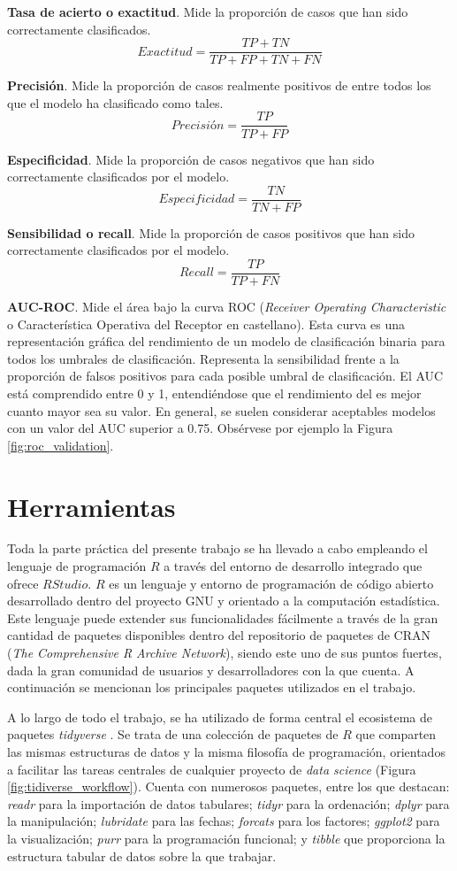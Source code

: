 \documentclass[12pt,a4paper,]{book}
\numberwithin{dummy}{section}
\theoremstyle{ocrenumbox}
\theoremstyle{blacknumex}
\theoremstyle{blacknumbox}
\theoremstyle{ocrenum}
\theoremstyle{ocrenum}
\begin{document}
\textbf{Tasa de acierto o exactitud}. Mide la proporción de casos que
han sido correctamente clasificados.
\[Exactitud = \frac{TP + TN}{TP + FP + TN + FN}\]

\textbf{Precisión}. Mide la proporción de casos realmente positivos de
entre todos los que el modelo ha clasificado como tales.
\[ Precisión = \frac{TP}{TP + FP}\]

\textbf{Especificidad}. Mide la proporción de casos negativos que han
sido correctamente clasificados por el modelo.
\[ Especificidad = \frac{TN}{TN + FP}\]

\textbf{Sensibilidad o recall}. Mide la proporción de casos positivos
que han sido correctamente clasificados por el modelo.
\[ Recall = \frac{TP}{TP + FN}\]

\textbf{AUC-ROC}. Mide el área bajo la curva ROC (\emph{Receiver
Operating Characteristic} o Característica Operativa del Receptor en
castellano). Esta curva es una representación gráfica del rendimiento de
un modelo de clasificación binaria para todos los umbrales de
clasificación. Representa la sensibilidad frente a la proporción de
falsos positivos para cada posible umbral de clasificación. El AUC está
comprendido entre 0 y 1, entendiéndose que el rendimiento del es mejor
cuanto mayor sea su valor. En general, se suelen considerar aceptables
modelos con un valor del AUC superior a 0.75. Obsérvese por ejemplo la
Figura \ref{fig:roc_validation}.

\hypertarget{herramientas}{%
\section{Herramientas}\label{herramientas}}

Toda la parte práctica del presente trabajo se ha llevado a cabo
empleando el lenguaje de programación \(R\) \citep{Rproject} a través
del entorno de desarrollo integrado que ofrece \(RStudio\). \(R\) es un
lenguaje y entorno de programación de código abierto desarrollado dentro
del proyecto GNU y orientado a la computación estadística. Este lenguaje
puede extender sus funcionalidades fácilmente a través de la gran
cantidad de paquetes disponibles dentro del repositorio de paquetes de
CRAN (\emph{The Comprehensive R Archive Network}), siendo este uno de
sus puntos fuertes, dada la gran comunidad de usuarios y desarrolladores
con la que cuenta. A continuación se mencionan los principales paquetes
utilizados en el trabajo.

A lo largo de todo el trabajo, se ha utilizado de forma central el
ecosistema de paquetes \emph{tidyverse} \citep{tidyversepackage}. Se
trata de una colección de paquetes de \(R\) que comparten las mismas
estructuras de datos y la misma filosofía de programación, orientados a
facilitar las tareas centrales de cualquier proyecto de \emph{data
science} (Figura \ref{fig:tidiverse_workflow}). Cuenta con numerosos
paquetes, entre los que destacan: \emph{readr} para la importación de
datos tabulares; \emph{tidyr} para la ordenación; \emph{dplyr} para la
manipulación; \emph{lubridate} para las fechas; \emph{forcats} para los
factores; \emph{ggplot2} para la visualización; \emph{purr} para la
programación funcional; y \emph{tibble} que proporciona la estructura
tabular de datos sobre la que trabajar.
\end{document}
